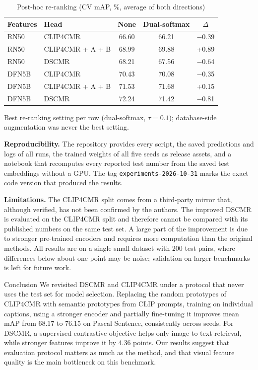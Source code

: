 \documentclass[conference]{IEEEtran}
\makeatletter
\def\section{\@startsection{section}{1}{\z@}{2.2ex plus 1ex minus .5ex}{1ex plus .3ex}%
  {\normalfont\fontsize{12}{14}\selectfont\bfseries\scshape\centering}}
\makeatother
\begin{document}
\begin{table}[t]
\centering
\caption{Post-hoc re-ranking (CV mAP, \%, average of both directions)}
\label{tab:rerank}
\small
\begin{tabular*}{\columnwidth}{@{\extracolsep{\fill}}llccc@{}}
\toprule
Features & Head & None & Dual-softmax & $\Delta$ \\
\midrule
RN50 & CLIP4CMR & 66.60 & 66.21 & $-$0.39 \\
RN50 & CLIP4CMR + A + B & 68.99 & 69.88 & +0.89 \\
RN50 & DSCMR & 68.21 & 67.56 & $-$0.64 \\
DFN5B & CLIP4CMR & 70.43 & 70.08 & $-$0.35 \\
DFN5B & CLIP4CMR + A + B & 71.53 & 71.68 & +0.15 \\
DFN5B & DSCMR & 72.24 & 71.42 & $-$0.81 \\
\bottomrule
\end{tabular*}

\vspace{2pt}
\parbox{\columnwidth}{\footnotesize Best re-ranking setting per row (dual-softmax, $\tau = 0.1$); database-side augmentation was never the best setting.}
\end{table}

\textbf{Reproducibility.} The repository provides every script, the saved predictions and logs of all runs, the trained weights of all five seeds as release assets, and a notebook that recomputes every reported test number from the saved test embeddings without a GPU. The tag \texttt{experiments-2026-10-31} marks the exact code version that produced the results.

\textbf{Limitations.} The CLIP4CMR split comes from a third-party mirror that, although verified, has not been confirmed by the authors. The improved DSCMR is evaluated on the CLIP4CMR split and therefore cannot be compared with its published numbers on the same test set. A large part of the improvement is due to stronger pre-trained encoders and requires more computation than the original methods. All results are on a single small dataset with 200 test pairs, where differences below about one point may be noise; validation on larger benchmarks is left for future work.

\section{Conclusion}
We revisited DSCMR and CLIP4CMR under a protocol that never uses the test set for model selection. Replacing the random prototypes of CLIP4CMR with semantic prototypes from CLIP prompts, training on individual captions, using a stronger encoder and partially fine-tuning it improves mean mAP from 68.17 to 76.15 on Pascal Sentence, consistently across seeds. For DSCMR, a supervised contrastive objective helps only image-to-text retrieval, while stronger features improve it by 4.36 points. Our results suggest that evaluation protocol matters as much as the method, and that visual feature quality is the main bottleneck on this benchmark.
\end{document}
